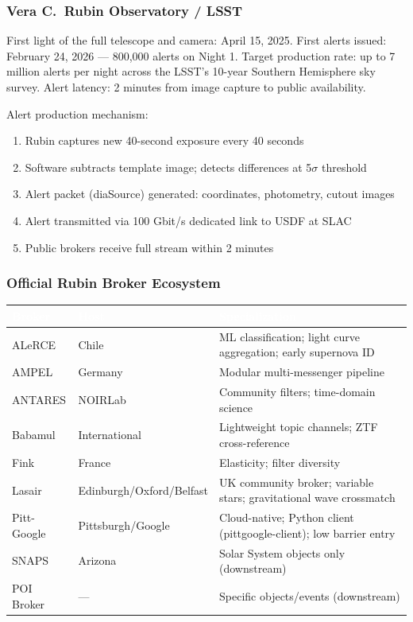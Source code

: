 \documentclass[11pt,letterpaper]{article}
\newcommand{\tableheader}[1]{\textbf{\sffamily\textcolor{white}{#1}}}
\begin{document}
\subsubsection{Vera C.\ Rubin Observatory / LSST}

First light of the full telescope and camera: April 15, 2025. First alerts issued: February 24, 2026 --- 800,000 alerts on Night 1. Target production rate: up to 7 million alerts per night across the LSST's 10-year Southern Hemisphere sky survey. Alert latency: 2 minutes from image capture to public availability.

Alert production mechanism:
\begin{enumerate}
  \item Rubin captures new 40-second exposure every 40 seconds
  \item Software subtracts template image; detects differences at 5$\sigma$ threshold
  \item Alert packet (diaSource) generated: coordinates, photometry, cutout images
  \item Alert transmitted via 100 Gbit/s dedicated link to USDF at SLAC
  \item Public brokers receive full stream within 2 minutes
\end{enumerate}

\subsubsection{Official Rubin Broker Ecosystem}

\begin{center}
\begin{tabularx}{\textwidth}{L{3cm}L{2.5cm}X}
\toprule
{}
\tableheader{Broker} & \tableheader{Host} & \tableheader{Specialization} \\
\midrule
ALeRCE & Chile & ML classification; light curve aggregation; early supernova ID \\
AMPEL & Germany & Modular multi-messenger pipeline \\
ANTARES & NOIRLab & Community filters; time-domain science \\
Babamul & International & Lightweight topic channels; ZTF cross-reference \\
Fink & France & Elasticity; filter diversity \\
Lasair & Edinburgh/Oxford/Belfast & UK community broker; variable stars; gravitational wave crossmatch \\
Pitt-Google & Pittsburgh/Google & Cloud-native; Python client (pittgoogle-client); low barrier entry \\
SNAPS & Arizona & Solar System objects only (downstream) \\
POI Broker & --- & Specific objects/events (downstream) \\
\bottomrule
\end{tabularx}
\end{center}
\end{document}
